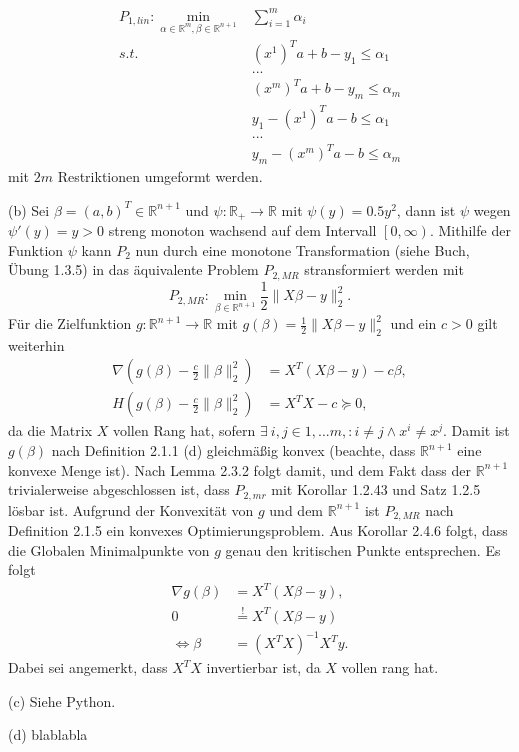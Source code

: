 \documentclass[ngerman, a4paper,12pt]{article}
\begin{document}
\begin{equation*}
	\begin{split}
	P_{1, lin}: \min_{\alpha \in \mathbb{R}^m, \beta \in \mathbb{R}^{n+1}} & \sum_{i=1}^{m} \alpha_i \\
	s.t. \ &(x^1)^Ta + b -y_1 \leq \alpha_1 \\
	& ... \\
	& (x^m)^Ta + b -y_m \leq \alpha_m \\
	& y_1 - (x^1)^Ta - b \leq \alpha_1 \\
	& ... \\
	& y_m - (x^m)^Ta - b \leq \alpha_m 
	\end{split}
\end{equation*}
mit $2m$ Restriktionen umgeformt werden. \par
(b) Sei $\beta = (a, b)^T \in \mathbb{R}^{n+1}$ und $\psi: \mathbb{R}_+ \rightarrow \mathbb{R}$ mit $\psi(y)=0.5y^2$, dann ist $\psi$ wegen $\psi'(y)=y > 0$ streng monoton wachsend auf dem Intervall $\left[0, \infty \right)$. Mithilfe der Funktion $\psi$ kann $P_2$ nun durch eine monotone Transformation (siehe Buch, Übung 1.3.5) in das äquivalente Problem $P_{2, MR}$ stransformiert werden mit
\begin{equation*}
	P_{2, MR}:\min_{\beta \in \mathbb{R}^{n+1}} \frac{1}{2} \|X \beta - y \|_2^2.
\end{equation*}
Für die Zielfunktion $g: \mathbb{R}^{n+1} \rightarrow \mathbb{R}$ mit $g(\beta)= \frac{1}{2} \|X \beta - y \|_2^2$ und ein $c>0$ gilt weiterhin
\begin{equation*}
\begin{split}
	\nabla (g(\beta) - \frac{c}{2} \| \beta \|_2^2) &= X^T(X\beta - y) - c\beta, \\
	H(g(\beta) - \frac{c}{2} \| \beta \|_2^2) &= X^TX - c \succeq 0,
\end{split}
\end{equation*}
da die Matrix $X$ vollen Rang hat, sofern $\exists \ i,j \in {1, ...m ,}: i \neq j \wedge x^i \neq x^j$. Damit ist $g(\beta)$ nach Definition 2.1.1 (d) gleichmäßig konvex (beachte, dass $\mathbb{R}^{n+1}$ eine konvexe Menge ist). Nach Lemma 2.3.2 folgt damit, und dem Fakt dass der $\mathbb{R}^{n+1}$ trivialerweise abgeschlossen ist, dass $P_{2, mr}$ mit Korollar 1.2.43 und Satz 1.2.5 lösbar ist. Aufgrund der Konvexität von $g$ und dem $\mathbb{R}^{n+1}$ ist $P_{2,MR}$ nach Definition 2.1.5 ein konvexes Optimierungsproblem. Aus Korollar 2.4.6 folgt, dass die Globalen Minimalpunkte von $g$ genau den kritischen Punkte entsprechen. Es folgt
\begin{equation}
	\begin{split}
		\nabla g(\beta) &= X^T(X\beta -y),\\
		0 &\overset{!}{=} X^T(X\beta -y) \\
		\iff \beta	&=	(X^TX)^{-1}X^Ty.
	\end{split}
\end{equation}
Dabei sei angemerkt, dass $X^TX$ invertierbar ist, da $X$ vollen rang hat. \par
(c) Siehe Python. \par
(d) blablabla
\end{document}

